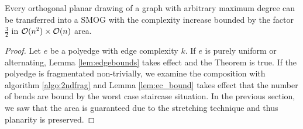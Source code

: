 \begin{theorem}
	Every orthogonal planar drawing of a graph with arbitrary maximum degree can be transferred into a SMOG with the complexity increase bounded by the factor $\frac{3}{2}$ in $\mathcal{O}(n^2)\times\mathcal{O}(n)$ area.
\end{theorem}
\begin{proof}
	Let $e$ be a polyedge with edge complexity $k$. If $e$ is purely uniform or alternating, Lemma \ref{lem:edgebounds} takes effect and the Theorem is true. If the polyedge is fragmentated non-trivially, we examine the composition with algorithm \ref{algo:2ndfrag} and Lemma \ref{lem:ec_bound} takes effect that the number of bends are bound by the worst case staircase situation. In the previous section, we saw that the area is guaranteed due to the stretching technique and thus planarity is preserved.
\end{proof}
